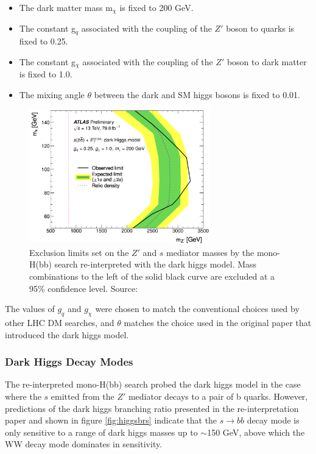 \documentclass[12pt]{article}
\begin{document}
\begin{itemize}
\item The dark matter mass m$_\chi$ is fixed to 200 GeV.
\item The constant g$_q$ associated with the coupling of the $Z'$ boson to quarks is fixed to 0.25.
\item The constant g$_\chi$ associated with the coupling of the $Z'$ boson to dark matter is fixed to 1.0.
\item The mixing angle $\theta$ between the dark and SM higgs bosons is fixed to 0.01.
\end{itemize}

\begin{figure}[H]
	\centering
	\includegraphics[width=0.7\textwidth]{figures/monosbb_exclusion.png}
	\caption[]{Exclusion limits set on the $Z'$ and $s$ mediator masses by the mono-H(bb) search re-interpreted with the dark higgs model. Mass combinations to the left of the solid black curve are excluded at a 95\% confidence level. Source: \cite{monohbb_recast}}
	\label{fig:monosbb_exclusion}
\end{figure}

The values of $g_q$ and $g_\chi$ were chosen to match the conventional choices used by other LHC DM searches, and $\theta$ matches the choice used in the original paper \cite{dark_higgs} that introduced the dark higgs model.

\subsubsection{Dark Higgs Decay Modes}

The re-interpreted mono-H(bb) search probed the dark higgs model in the case where the $s$ emitted from the $Z'$ mediator decays to a pair of b quarks. However, predictions of the dark higgs branching ratio presented in the re-interpretation paper \cite{monohbb_recast} and shown in figure \ref{fig:higgsbrs} indicate that the $s \rightarrow bb$ decay mode is only sensitive to a range of dark higgs masses up to $\sim$150 GeV, above which the WW decay mode dominates in sensitivity. 
\end{document}
